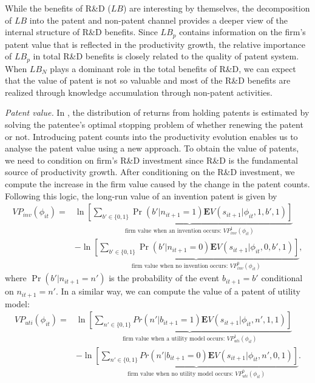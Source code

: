 \documentclass[11pt]{article}
\begin{document}
While the benefits of R\&D ($LB$) are interesting by themselves, the decomposition of $LB$ into the patent and non-patent channel provides a deeper view of the internal structure of R\&D benefits. Since $LB_p$ contains information on the firm's patent value that is reflected in the productivity growth, the relative importance of $LB_p$ in total R\&D benefits is closely related to the quality of patent system. When $LB_N$ plays a dominant role in the total benefits of R\&D, we can expect that the value of patent is not so valuable and most of the R\&D benefits are realized through knowledge accumulation through non-patent activities.

\textit{Patent value.} In \cite{pakes1986}, the distribution of returns from holding patents is estimated by solving the patentee’s optimal stopping problem of whether renewing the patent or not. Introducing patent counts into the productivity evolution enables us to analyse the patent value using a new approach. To obtain the value of patents, we need to condition on firm’s R\&D investment since R\&D is the fundamental source of productivity growth. After conditioning on the R\&D investment, we compute the increase in the firm value caused by the change in the patent counts. Following this logic, the long-run value of an invention patent is given by
\begin{align} \label{vp_inv}
    VP_{inv}(\phi_{it}) =& \ln \underbrace{\left[\sum_{b'\in\{0, 1\}}\Pr(b'|n_{it+1}=1)\mathbf{E}V(s_{it+1}|\phi_{it}, 1, b', 1)\right]}_{\text{firm value when an invention occurs: }VP_{inv}^1(\phi_{it})} \\
                         & - \ln \underbrace{\left[\sum_{b'\in\{0, 1\}}\Pr(b'|n_{it+1}=0)\mathbf{E}V(s_{it+1}|\phi_{it}, 0, b', 1)\right]}_{\text{firm value when no invention occurs: }VP_{inv}^0(\phi_{it})}, \nonumber                
\end{align}
where $\Pr(b'|n_{it+1} = n')$ is the probability of the event $b_{it+1} = b'$ conditional on $n_{it+1} = n'$. In a similar way, we can compute the value of a patent of utility model:
\begin{align} \label{vp_uti}
    VP_{uti}(\phi_{it}) = &  \ln \underbrace{\left[\sum_{n'\in\{0, 1\}}Pr(n'|b_{it+1}=1)\mathbf{E}V(s_{it+1}|\phi_{it}, n', 1, 1)\right]}_{\text{firm value when a utility model occurs: }VP_{uti}^1(\phi_{it})} \\
                         &-\ln\underbrace{ \left[\sum_{n'\in\{0, 1\}}Pr(n'|b_{it+1}=0)\mathbf{E}V(s_{it+1}|\phi_{it}, n', 0, 1)\right]}_{\text{firm value when no utility model occurs: } VP_{uti}^0(\phi_{it})}. \nonumber  
\end{align}
\end{document}
